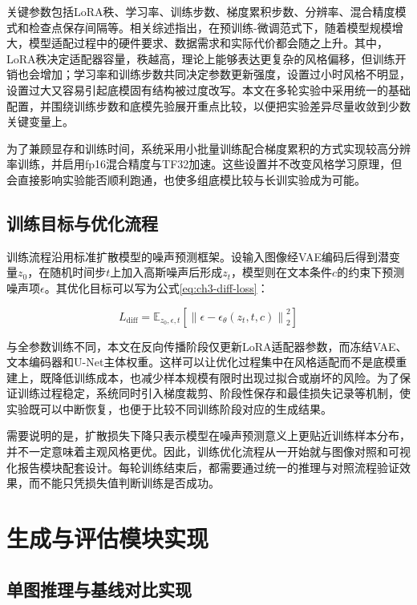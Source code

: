 关键参数包括LoRA秩、学习率、训练步数、梯度累积步数、分辨率、混合精度模式和检查点保存间隔等。相关综述指出，在预训练-微调范式下，随着模型规模增大，模型适配过程中的硬件要求、数据需求和实际代价都会随之上升\cite{ref36}。其中，LoRA秩决定适配器容量，秩越高，理论上能够表达更复杂的风格偏移，但训练开销也会增加；学习率和训练步数共同决定参数更新强度，设置过小时风格不明显，设置过大又容易引起底模固有结构被过度改写。本文在多轮实验中采用统一的基础配置，并围绕训练步数和底模先验展开重点比较，以便把实验差异尽量收敛到少数关键变量上。

为了兼顾显存和训练时间，系统采用小批量训练配合梯度累积的方式实现较高分辨率训练，并启用fp16混合精度与TF32加速。这些设置并不改变风格学习原理，但会直接影响实验能否顺利跑通，也使多组底模比较与长训实验成为可能。

\subsection{训练目标与优化流程}

训练流程沿用标准扩散模型的噪声预测框架。设输入图像经VAE编码后得到潜变量$z_0$，在随机时间步$t$上加入高斯噪声后形成$z_t$，模型则在文本条件$c$的约束下预测噪声项$\epsilon$。其优化目标可以写为公式\ref{eq:ch3-diff-loss}：

\begin{equation}
L_{\mathrm{diff}} = \mathbb{E}_{z_0,\epsilon,t}\left[\left\lVert \epsilon - \epsilon_\theta(z_t, t, c) \right\rVert_2^2\right]
\label{eq:ch3-diff-loss}
\end{equation}

与全参数训练不同，本文在反向传播阶段仅更新LoRA适配器参数，而冻结VAE、文本编码器和U-Net主体权重。这样可以让优化过程集中在风格适配而不是底模重建上，既降低训练成本，也减少样本规模有限时出现过拟合或崩坏的风险。为了保证训练过程稳定，系统同时引入梯度裁剪、阶段性保存和最佳损失记录等机制，使实验既可以中断恢复，也便于比较不同训练阶段对应的生成结果。

需要说明的是，扩散损失下降只表示模型在噪声预测意义上更贴近训练样本分布，并不一定意味着主观风格更优。因此，训练优化流程从一开始就与图像对照和可视化报告模块配套设计。每轮训练结束后，都需要通过统一的推理与对照流程验证效果，而不能只凭损失值判断训练是否成功。

\section{生成与评估模块实现}

\subsection{单图推理与基线对比实现}

